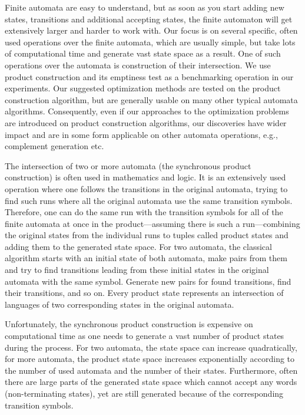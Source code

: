 Finite automata are easy to understand, but as soon as you start adding new states, transitions and additional accepting states, the finite automaton will get extensively larger and harder to work with.
Our focus is on several specific, often used operations over the finite automata, which are usually simple, but take lots of computational time and generate vast state space as a result. One of such operations over the automata is construction of their intersection. We use product construction and its emptiness test as a benchmarking operation in our experiments. Our suggested optimization methods are tested on the product construction algorithm, but are generally usable on many other typical automata algorithms. Consequently, even if our approaches to the optimization problems are introduced on product construction algorithms, our discoveries have wider impact and are in some form applicable on other automata operations, e.g., complement generation etc.


The intersection of two or more automata (the synchronous product construction) is often used in mathematics and logic. It is an extensively used operation where one follows the transitions in the original automata, trying to find such runs where all the original automata use the same transition symbols. Therefore, one can do the same run with the transition symbols for all of the finite automata at once in the product---assuming there is such a run---combining the original states from the individual runs to tuples called product states and adding them to the generated state space. For two automata, the classical algorithm starts with an initial state of both automata, make pairs from them and try to find transitions leading from these initial states in the original automata with the same symbol. Generate new pairs for found transitions, find their transitions, and so on. Every product state represents an intersection of languages of two corresponding states in the original automata.

Unfortunately, the synchronous product construction is expensive on computational time as one needs to generate a vast number of product states during the process. For two automata, the state space can increase quadratically, for more automata, the product state space increases exponentially according to the number of used automata and the number of their states. Furthermore, often there are large parts of the generated state space which cannot accept any words (non-terminating states), yet are still generated because of the corresponding transition symbols.

